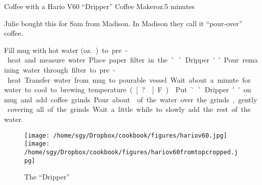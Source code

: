 \begin{recipe}{Coffee with a Hario V60\tm{} ``Dripper'' Coffee Maker}{\unit[6--8]{oz.}}{5 minutes}

\freeform Julie bought this for Sam from Madison.  In Madison they
call it ``pour-over'' coffee.

 Fill mug with hot water
(\unit[6--8]{oz.}) to pre-heat and measure water.  Place paper filter in the
``Dripper.'' Pour remaining water through filter to pre-heat.
Transfer water from mug to pourable vessel.  Wait about a minute for water to cool to brewing temperature (\unit[?\0]{F}).

 Put ``Dripper'' on mug and add coffee
grinds.  Pour about  of the water over the grinds, gently
covering all of the grinds.  Wait a little while to slowly add the
rest of the water.

\end{recipe}
\begin{figure}[b!]
\begin{center}
\texttt{[image: /home/sgy/Dropbox/cookbook/figures/hariov60.jpg]}
\hspace{0.1\textwidth}
\texttt{[image: /home/sgy/Dropbox/cookbook/figures/hariov60fromtopcropped.jpg]}
\end{center}
\caption*{The ``Dripper'' }
\end{figure}
\clearpage
